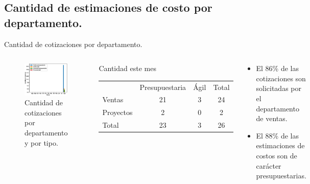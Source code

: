 \documentclass[aspectratio=169,xcolor=dvipsnames]{beamer}
\begin{document}
\subsection{Cantidad de estimaciones de costo por departamento.}
\begin{frame}{Cantidad de cotizaciones por departamento.}
\begin{columns}[c]
\begin{figure}
     \includegraphics[width=\textwidth]{EPS/cantidad_cotizaciones_departamento_tipo.eps}
     \caption{Cantidad de cotizaciones por departamento y por tipo.}
     \label{graph:cantidad_cotizaciones_departamento_tipo}
\end{figure}

 \begin{block}{Cantidad este mes}
     \begin{tabular}{lccc}
                    &Presupuestaria&Ágil & Total\\
          Ventas &21 & 3 &  24\\
          Proyectos&2& 0& 2\\ \hline
          Total& 23& 3 & 26\\
     \end{tabular}
\end{block}


\begin{block}{}
    \begin{itemize}
        \item El 86\% de las cotizaciones son solicitadas por el departamento de ventas.
        \item El 88\% de las estimaciones de costos son de carácter presupuestarias.
    \end{itemize}
\end{block} 

\end{columns}
\end{frame}
\end{document}

